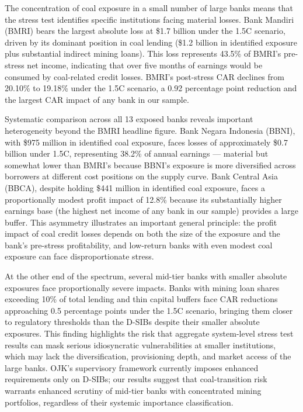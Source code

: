 The concentration of coal exposure in a small number of large banks means that the stress test identifies specific institutions facing material losses. Bank Mandiri (BMRI) bears the largest absolute loss at \$1.7 billion under the 1.5\textdegree C scenario, driven by its dominant position in coal lending (\$1.2 billion in identified exposure plus substantial indirect mining loans). This loss represents 43.5\% of BMRI's pre-stress net income, indicating that over five months of earnings would be consumed by coal-related credit losses. BMRI's post-stress CAR declines from 20.10\% to 19.18\% under the 1.5\textdegree C scenario, a 0.92 percentage point reduction and the largest CAR impact of any bank in our sample.

Systematic comparison across all 13 exposed banks reveals important heterogeneity beyond the BMRI headline figure. Bank Negara Indonesia (BBNI), with \$975 million in identified coal exposure, faces losses of approximately \$0.7 billion under 1.5\textdegree C, representing 38.2\% of annual earnings --- material but somewhat lower than BMRI's because BBNI's exposure is more diversified across borrowers at different cost positions on the supply curve. Bank Central Asia (BBCA), despite holding \$441 million in identified coal exposure, faces a proportionally modest profit impact of 12.8\% because its substantially higher earnings base (the highest net income of any bank in our sample) provides a large buffer. This asymmetry illustrates an important general principle: the profit impact of coal credit losses depends on both the size of the exposure and the bank's pre-stress profitability, and low-return banks with even modest coal exposure can face disproportionate stress.

At the other end of the spectrum, several mid-tier banks with smaller absolute exposures face proportionally severe impacts. Banks with mining loan shares exceeding 10\% of total lending and thin capital buffers face CAR reductions approaching 0.5 percentage points under the 1.5\textdegree C scenario, bringing them closer to regulatory thresholds than the D-SIBs despite their smaller absolute exposures. This finding highlights the risk that aggregate system-level stress test results can mask serious idiosyncratic vulnerabilities at smaller institutions, which may lack the diversification, provisioning depth, and market access of the large banks. OJK's supervisory framework currently imposes enhanced requirements only on D-SIBs; our results suggest that coal-transition risk warrants enhanced scrutiny of mid-tier banks with concentrated mining portfolios, regardless of their systemic importance classification.

